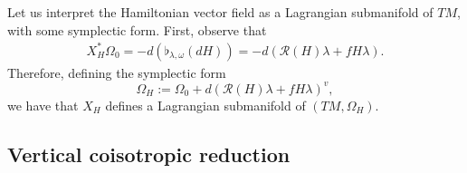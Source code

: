 \documentclass[12pt]{article}
\newtheorem{lemma}{Lemma}[section]
\begin{document}
Let us interpret the Hamiltonian vector field as a Lagrangian submanifold of $TM$, with some symplectic form. First, observe that
\begin{align*}
    X_H ^* \Omega_0 = - d(\flat_{\lambda, \omega}(dH)) = - d\left(  \mathcal{R}(H) \lambda + fH \lambda\right).
\end{align*}
Therefore, defining the symplectic form $$\Omega_H := \Omega_0 + d(\mathcal{R}(H)  \lambda + fH \lambda)^v,$$ we have that $X_H$ defines a Lagrangian submanifold of $(TM, \Omega_H).$

 \subsection{Vertical coisotropic reduction}

\end{document}
